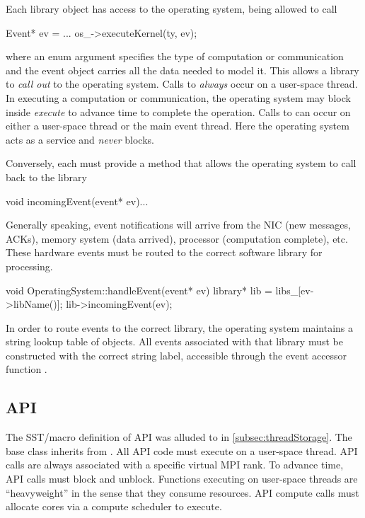Each library object has access to the operating system, being allowed to call

\begin{CppCode}
Event* ev = ...
os_->executeKernel(ty, ev);
\end{CppCode}
where an enum argument  specifies the type of computation or communication and the event object carries all the data needed to model it.
This allows a library to \emph{call out} to the operating system.
Calls to  \emph{always} occur on a user-space thread. 
In executing a computation or communication, the operating system may block inside \emph{execute} to advance time to complete the operation.
Calls to  can occur on either a user-space thread or the main event thread.
Here the operating system acts as a service and \emph{never} blocks.

Conversely, each  must provide a  method that allows the operating system to call back to the library

\begin{CppCode}
void incomingEvent(event* ev){...}
\end{CppCode}
Generally speaking, event notifications will arrive from the NIC (new messages, ACKs), memory system (data arrived), processor (computation complete), etc.
These hardware events must be routed to the correct software library for processing.

\begin{CppCode}
void OperatingSystem::handleEvent(event* ev) {
  library* lib = libs_[ev->libName()];
  lib->incomingEvent(ev);
}
\end{CppCode}
In order to route events to the correct library, the operating system maintains a string lookup table of  objects.
All events associated with that library must be constructed with the correct string label, 
accessible through the event accessor function .

\subsection{API}
\label{subsec:softwareAPI}
The SST/macro definition of API was alluded to in \ref{subsec:threadStorage}.
The base  class inherits from .
All API code must execute on a user-space thread.
API calls are always associated with a specific virtual MPI rank.
To advance time, API calls must block and unblock.
Functions executing on user-space threads are ``heavyweight'' in the sense that they consume resources.
API compute calls must allocate cores via a compute scheduler to execute.


